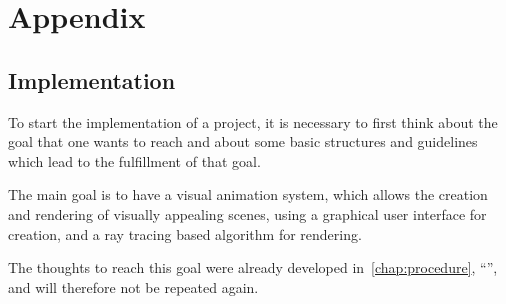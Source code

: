 \documentclass[
    a4paper,      %
    10pt,         %
    openright,    %
    notitlepage,  %
    parskip=half, %
]{scrreprt}       %
\theoremstyle{definition}                    %
\begin{document}
\cleardoublepage{}
\glsaddall{}
\printglossaries{}

\cleardoublepage{}
\printbibliography{}

{}
\listoffigures
{}
\listoftables
{}
\lstlistoflistings{}



\chapter{Appendix}
\label{chap:appendix}


\section{Implementation}
\label{sec:appendix-implementation}

To start the implementation of a project, it is necessary to first think about the
goal that one wants to reach and about some basic structures and guidelines
which lead to the fulfillment of that goal.

The main goal is to have a visual animation system, which allows the creation
and rendering of visually appealing scenes, using a graphical user interface for
creation, and a ray tracing based algorithm for rendering.

The thoughts to reach this goal were already developed
in~\autoref{chap:procedure}, \enquote{}, and will
therefore not be repeated again.
\end{document}
